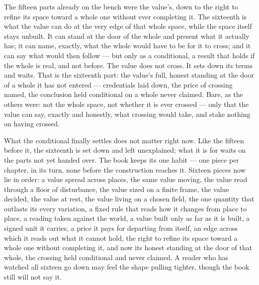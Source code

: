 The fifteen parts already on the bench were the value's, down to the right to refine its space toward a whole one without ever completing it. The sixteenth is what the value can do at the very edge of that whole space, while the space itself stays unbuilt. It can stand at the door of the whole and present what it actually has; it can name, exactly, what the whole would have to be for it to cross; and it can say what would then follow --- but only as a conditional, a result that holds if the whole is real, and not before. The value does not cross. It sets down its terms and waits. That is the sixteenth part: the value's full, honest standing at the door of a whole it has not entered --- credentials laid down, the price of crossing named, the conclusion held conditional on a whole never claimed. Bare, as the others were: not the whole space, not whether it is ever crossed --- only that the value can say, exactly and honestly, what crossing would take, and stake nothing on having crossed.

What the conditional finally settles does not matter right now. Like the fifteen before it, the sixteenth is set down and left unexplained; what it is for waits on the parts not yet handed over. The book keeps its one habit --- one piece per chapter, in its turn, none before the construction reaches it. Sixteen pieces now lie in order: a value spread across places, the same value moving, the value read through a floor of disturbance, the value sized on a finite frame, the value decided, the value at rest, the value living on a chosen field, the one quantity that outlasts its every variation, a fixed rule that reads how it changes from place to place, a reading taken against the world, a value built only as far as it is built, a signed unit it carries, a price it pays for departing from itself, an edge across which it reads out what it cannot hold, the right to refine its space toward a whole one without completing it, and now its honest standing at the door of that whole, the crossing held conditional and never claimed. A reader who has watched all sixteen go down may feel the shape pulling tighter, though the book still will not say it.

